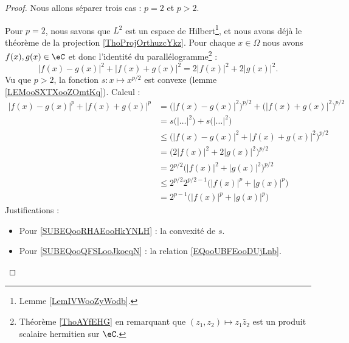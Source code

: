 \begin{proof}
	Nous allons séparer trois cas : \( p=2\) et \( p>2\).
	\begin{subproof}
		\spitem[\( p=2\)]
		Pour \( p=2\), nous savons que \( L^2\) est un espace de Hilbert\footnote{Lemme \ref{LemIVWooZyWodb}.}, et nous avons déjà le théorème de la projection \ref{ThoProjOrthuzcYkz}.
		\spitem[\( p>2\)]
		Pour chaque \( x\in \Omega\) nous avons \( f(x), g(x)\in \eC\) et donc l'identité du parallélogramme\footnote{Théorème \ref{ThoAYfEHG} en remarquant que \( (z_1,z_2)\mapsto z_1\bar z_2\) est un produit scalaire hermitien sur \( \eC\).} :
		\begin{equation}        \label{EQooUBFEooDUjLnb}
			\big| f(x)-g(x) \big|^2+\big| f(x)+g(x) \big|^2=2| f(x) |^2+2| g(x) |^2.
		\end{equation}
		Vu que \( p>2\), la fonction \( s\colon x\mapsto  x^{p/2}\) est convexe (lemme \ref{LEMooSXTXooZOmtKq}). Calcul :
		\begin{subequations}
			\begin{align}
				| f(x)-g(x) |^p+| f(x)+g(x) |^p & =\big( | f(x)-g(x) |^2 \big)^{p/2}+\big( | f(x)+g(x) |^2 \big)^{p/2}                    \\
				                                & =s\big( | \ldots |^2 \big)+s\big( | \ldots |^2 \big)                                    \\
				                                & \leq \big( | f(x)-g(x) |^2+| f(x)+g(x) |^2 \big)^{p/2}     \label{SUBEQooRHAEooHkYNLH}  \\
				                                & =\big( 2| f(x) |^2+2| g(x) |^2 \big)^{p/2}                 \label{SUBEQooQFSLooJkoeqN}  \\
				                                & =2^{p/2}\big( | f(x) |^2+| g(x) |^2 \big)^{p/2}                                         \\
				                                & \leq  2^{p/2}2^{p/2-1}\big( | f(x) |^p+| g(x) |^p \big)     \label{SUBEQooQSUHooXKaWwO} \\
				                                & =2^{p-1}\big( | f(x) |^p+| g(x) |^p \big)
			\end{align}
		\end{subequations}
		Justifications :
		\begin{itemize}
			\item Pour \eqref{SUBEQooRHAEooHkYNLH} : la convexité de \( s\).
			\item Pour \eqref{SUBEQooQFSLooJkoeqN} : la relation \eqref{EQooUBFEooDUjLnb}.

\end{itemize}
\end{subproof}
\end{proof}
